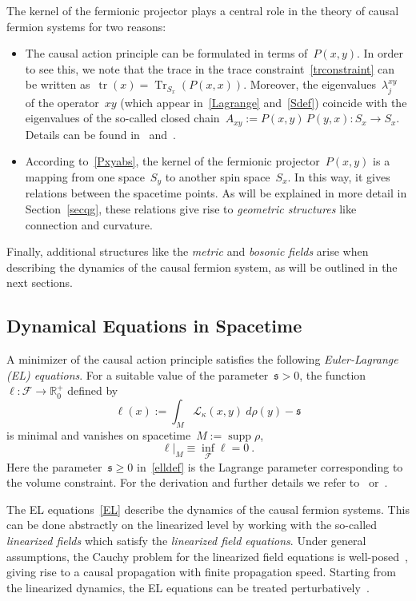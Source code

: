 \documentclass[reqno,11pt]{amsart}
\numberwithin{equation}{section}
\newcommand{\beq}{\begin{equation}}
\newcommand{\eeq}{\end{equation}}
\newcommand{\R}{\mathbb{R}}
\newcommand{\1}{\mbox{\rm 1 \hspace{-1.05 em} 1}}
\newcommand{\F}{{\mathscr{F}}}
\renewcommand{\L}{{\mathcal{L}}}
\newcommand{\s}{{\mathfrak{s}}}
\DeclareMathOperator{\Tr}{Tr}
\DeclareMathOperator{\tr}{tr}
\DeclareMathOperator{\supp}{supp}
\newcommand{\bitem}{\begin{itemize}[leftmargin=2em]}
\newcommand{\eitem}{\end{itemize}}
\begin{document}
The kernel of the fermionic projector plays a central role in the theory of causal fermion systems
for two reasons:
\bitem
\item[(i)] The causal action principle can be formulated in terms of~$P(x,y)$.
In order to see this, we note that the trace in the trace constraint~\eqref{trconstraint}
can be written as~$\tr(x) = \Tr_{S_x}(P(x,x))$. Moreover, the eigenvalues~$\lambda^{xy}_j$ of the operator~$xy$
(which appear in~\eqref{Lagrange} and~\eqref{Sdef}) coincide with the eigenvalues
of the so-called closed chain~$A_{xy} := P(x,y)\, P(y,x) : S_x \rightarrow S_x$.
Details can be found in~\cite[Section~1.1]{cfs} and~\cite[Section~5.6]{intro}.
\item[(ii)] According to~\eqref{Pxyabs}, the kernel of the fermionic projector~$P(x,y)$ is a mapping from one space~$S_y$
to another spin space~$S_x$. In this way, it gives relations between the spacetime points.
As will be explained in more detail in Section~\ref{secqg}, these relations give rise to {\em{geometric structures}}
like connection and curvature.
\eitem
Finally, additional structures like the {\em{metric}} and {\em{bosonic fields}} arise when
describing the dynamics of the causal fermion system, as will be outlined in the next sections.

\subsection{Dynamical Equations in Spacetime} \label{secdynamics}
A minimizer of the causal action principle satisfies the following {\em{Euler-Lagrange (EL) equations}}.
For a suitable value of the parameter~$\s>0$,
the function~$\ell : \F \rightarrow \R_0^+$ defined by
\beq \label{elldef}
\ell(x) := \int_M \L_\kappa(x,y)\: d\rho(y) - \s
\eeq
is minimal and vanishes on spacetime~$M:= \supp \rho$,
\beq \label{EL}
\ell|_M \equiv \inf_\F \ell = 0 \:.
\eeq
Here the parameter~$\s \geq 0$ in~\eqref{elldef} is the Lagrange parameter
corresponding to the volume constraint. For the derivation and further details we refer to~\cite[Section~2]{jet}
or~\cite[Chapter~7]{intro}.

The EL equations~\eqref{EL} describe the dynamics of the causal fermion systems.
This can be done abstractly on the linearized level by working with the so-called {\em{linearized fields}}
which satisfy the {\em{linearized field equations}}.
Under general assumptions, the Cauchy problem for the linearized field equations is well-posed~\cite{linhyp},
giving rise to a causal propagation with finite propagation speed.
Starting from the linearized dynamics, the EL equations can be treated perturbatively~\cite{perturb}.
\end{document}
